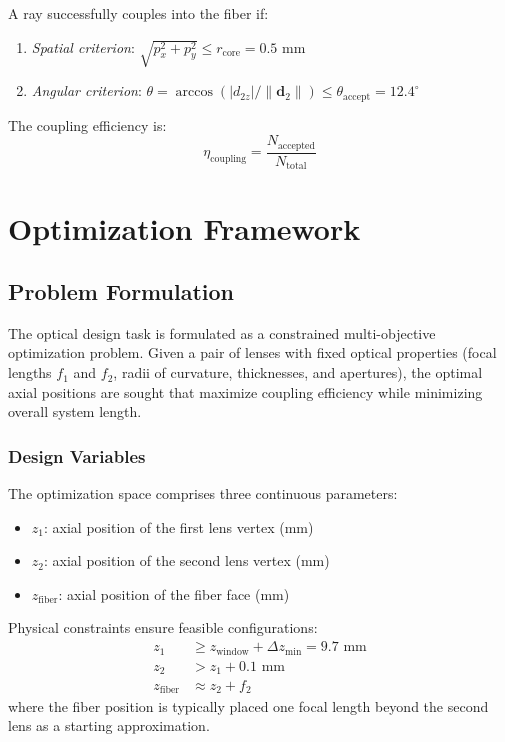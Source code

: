 A ray successfully couples into the fiber if:
\begin{enumerate}[leftmargin=*]
    \item \textit{Spatial criterion}: $\sqrt{p_x^2 + p_y^2} \leq r_{\text{core}} = 0.5$ mm
    \item \textit{Angular criterion}: $\theta = \arccos(|d_{2z}|/\|\mathbf{d}_2\|) \leq \theta_{\text{accept}} = 12.4^\circ$
\end{enumerate}
The coupling efficiency is:
\begin{equation}
\eta_{\text{coupling}} = \frac{N_{\text{accepted}}}{N_{\text{total}}}
\end{equation}

\section{Optimization Framework}

\subsection{Problem Formulation}

The optical design task is formulated as a constrained multi-objective optimization problem. Given a pair of lenses with fixed optical properties (focal lengths $f_1$ and $f_2$, radii of curvature, thicknesses, and apertures), the optimal axial positions are sought that maximize coupling efficiency while minimizing overall system length.

\subsubsection{Design Variables}

The optimization space comprises three continuous parameters:
\begin{itemize}[leftmargin=*]
    \item $z_1$: axial position of the first lens vertex (mm)
    \item $z_2$: axial position of the second lens vertex (mm)  
    \item $z_{\text{fiber}}$: axial position of the fiber face (mm)
\end{itemize}

Physical constraints ensure feasible configurations:
\begin{align}
z_1 &\geq z_{\text{window}} + \Delta z_{\text{min}} = 9.7\text{ mm} \\
z_2 &> z_1 + 0.1\text{ mm} \\
z_{\text{fiber}} &\approx z_2 + f_2
\end{align}
where the fiber position is typically placed one focal length beyond the second lens as a starting approximation.

